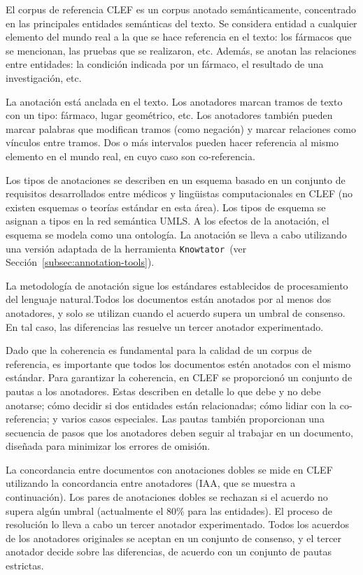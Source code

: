 El corpus de referencia CLEF es un corpus anotado semánticamente, concentrado en las principales entidades semánticas del texto.
Se considera entidad a cualquier elemento del mundo real a la que se hace referencia en el texto: los fármacos que se mencionan, las pruebas que se realizaron, etc.
Además, se anotan las relaciones entre entidades: la condición indicada por un fármaco, el resultado de una investigación, etc.

La anotación está anclada en el texto.
Los anotadores marcan tramos de texto con un tipo: fármaco, lugar geométrico, etc.
Los anotadores también pueden marcar palabras que modifican tramos (como negación) y marcar relaciones como vínculos entre tramos.
Dos o más intervalos pueden hacer referencia al mismo elemento en el mundo real, en cuyo caso son co-referencia.

Los tipos de anotaciones se describen en un esquema basado en un conjunto de requisitos desarrollados entre médicos y lingüistas computacionales en CLEF (no existen esquemas o teorías estándar en esta área).
Los tipos de esquema se asignan a tipos en la red semántica UMLS.
A los efectos de la anotación, el esquema se modela como una ontología.
La anotación se lleva a cabo utilizando una versión adaptada de la herramienta \texttt{Knowtator}~(ver Sección~\ref{subsec:annotation-tools}).

La metodología de anotación sigue los estándares establecidos de procesamiento del lenguaje natural.Todos los documentos están anotados por al menos dos anotadores, y solo se utilizan cuando el acuerdo supera un umbral de consenso.
En tal caso, las diferencias las resuelve un tercer anotador experimentado.

Dado que la coherencia es fundamental para la calidad de un corpus de referencia, es importante que todos los documentos estén anotados con el mismo estándar.
Para garantizar la coherencia, en CLEF se proporcionó un conjunto de pautas a los anotadores.
Estas describen en detalle lo que debe y no debe anotarse; cómo decidir si dos entidades están relacionadas; cómo lidiar con la co-referencia; y varios casos especiales.
Las pautas también proporcionan una secuencia de pasos que los anotadores deben seguir al trabajar en un documento, diseñada para minimizar los errores de omisión.

La concordancia entre documentos con anotaciones dobles se mide en CLEF utilizando la concordancia entre anotadores (IAA, que se muestra a continuación).
Los pares de anotaciones dobles se rechazan si el acuerdo no supera algún umbral (actualmente el 80\% para las entidades).
El proceso de resolución lo lleva a cabo un tercer anotador experimentado.
Todos los acuerdos de los anotadores originales se aceptan en un conjunto de consenso, y el tercer anotador decide sobre las diferencias, de acuerdo con un conjunto de pautas estrictas.


